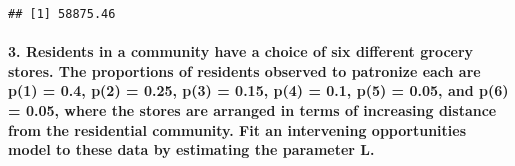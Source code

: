 \documentclass[
]{article}
\begin{document}
\begin{verbatim}
## [1] 58875.46
\end{verbatim}

\hypertarget{residents-in-a-community-have-a-choice-of-six-different-grocery-stores.-the-proportions-of-residents-observed-to-patronize-each-are-p1-0.4-p2-0.25-p3-0.15-p4-0.1-p5-0.05-and-p6-0.05-where-the-stores-are-arranged-in-terms-of-increasing-distance-from-the-residential-community.-fit-an-intervening-opportunities-model-to-these-data-by-estimating-the-parameter-l.}{%
\paragraph{3. Residents in a community have a choice of six different
grocery stores. The proportions of residents observed to patronize each
are p(1) = 0.4, p(2) = 0.25, p(3) = 0.15, p(4) = 0.1, p(5) = 0.05, and
p(6) = 0.05, where the stores are arranged in terms of increasing
distance from the residential community. Fit an intervening
opportunities model to these data by estimating the parameter
L.}\label{residents-in-a-community-have-a-choice-of-six-different-grocery-stores.-the-proportions-of-residents-observed-to-patronize-each-are-p1-0.4-p2-0.25-p3-0.15-p4-0.1-p5-0.05-and-p6-0.05-where-the-stores-are-arranged-in-terms-of-increasing-distance-from-the-residential-community.-fit-an-intervening-opportunities-model-to-these-data-by-estimating-the-parameter-l.}}
\end{document}
